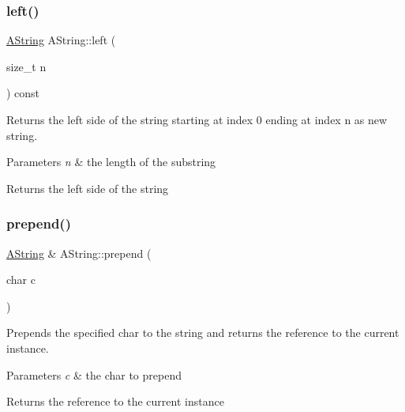 \subsubsection{\texorpdfstring{left()}{left()}}
{\footnotesize\ttfamily \mbox{\hyperlink{class_a_string}{A\+String}} A\+String\+::left (\begin{DoxyParamCaption}\item[{size\+\_\+t}]{n }\end{DoxyParamCaption}) const}



Returns the left side of the string starting at index 0 ending at index n as new string. 


\begin{DoxyParams}{Parameters}
{\em n} & the length of the substring \\
\hline
\end{DoxyParams}
\begin{DoxyReturn}{Returns}
the left side of the string 
\end{DoxyReturn}
\mbox{\label{class_a_string_a792e892cd6724764b3f279bbc23444c3}} 
\subsubsection{\texorpdfstring{prepend()}{prepend()}\hspace{0.1cm}{\footnotesize\ttfamily [1/2]}}
{\footnotesize\ttfamily \mbox{\hyperlink{class_a_string}{A\+String}} \& A\+String\+::prepend (\begin{DoxyParamCaption}\item[{char}]{c }\end{DoxyParamCaption})}



Prepends the specified char to the string and returns the reference to the current instance. 


\begin{DoxyParams}{Parameters}
{\em c} & the char to prepend \\
\hline
\end{DoxyParams}
\begin{DoxyReturn}{Returns}
the reference to the current instance 
\end{DoxyReturn}
\mbox{\label{class_a_string_a0835a8afa3a490196003c11e23653e4a}} 
